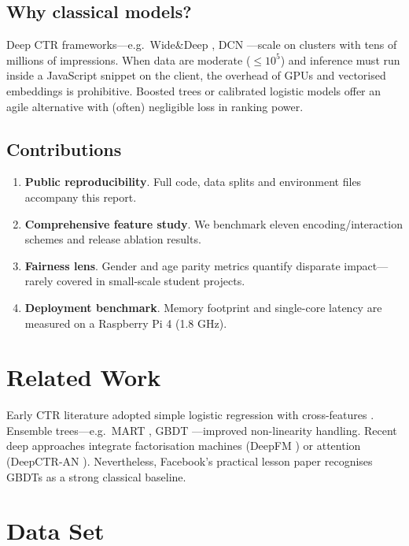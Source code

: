 \documentclass[12pt,a4paper]{article}
\begin{document}
\subsection{Why classical models?}
Deep CTR frameworks—e.g.\ Wide\&Deep \cite{Cheng2016},
DCN \cite{Wang2017}—scale on clusters with tens of millions of
impressions.  
When data are moderate (\(\le 10^5\)) and inference must run inside a
JavaScript snippet on the client, the overhead of GPUs and vectorised
embeddings is prohibitive.  
Boosted trees or calibrated logistic models offer an agile alternative
with (often) negligible loss in ranking power.

\subsection{Contributions}
\begin{enumerate}[leftmargin=2em]
  \item \textbf{Public reproducibility}.  Full code, data splits and
        environment files accompany this report.
  \item \textbf{Comprehensive feature study}.  We benchmark eleven
        encoding/interaction schemes and release ablation results.
  \item \textbf{Fairness lens}.  Gender and age parity metrics quantify
        disparate impact—rarely covered in small-scale student projects.
  \item \textbf{Deployment benchmark}.  Memory footprint and
        single-core latency are measured on a Raspberry Pi 4 (1.8 GHz).
\end{enumerate}

\section{Related Work} \label{sec:related}

Early CTR literature adopted simple logistic regression with
cross-features \cite{Richardson2007}.  
Ensemble trees—e.g.\ MART \cite{Li2010}, GBDT \cite{He2014}—improved
non-linearity handling.  
Recent deep approaches integrate factorisation machines
(DeepFM \cite{Guo2017}) or attention (DeepCTR-AN \cite{Yan2020}).
Nevertheless, Facebook’s practical lesson paper \cite{He2014}
recognises GBDTs as a strong classical baseline.

\section{Data Set} \label{sec:data}
\end{document}
